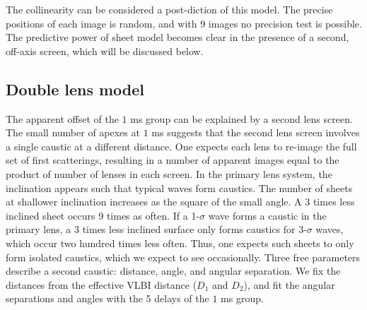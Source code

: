 \documentclass[useAMS,usenatbib]{mn2e}
\begin{document}
The collinearity can be considered a post-diction of this model.  The
precise positions of each image is random, and with 9 images no
precision test is possible.  The predictive power of sheet model
becomes clear in the presence of a second, off-axis screen, which will be discussed below.



\subsection{Double lens model}
\label{doublelensmodel}

The apparent offset of the $1$ ms group can be explained by a second lens
screen.  The small number of apexes at $1$ ms suggests that the second
lens screen involves a single caustic at a different distance.  One
expects each lens to re-image the full set of first scatterings,
resulting in a number of apparent images equal to the product of
number of lenses in each screen.
In the
primary lens system, the inclination appears such that typical waves
form caustics.  The number of sheets at shallower inclination
increases as the square of the small angle.  A 3 times less inclined
sheet occurs 9 times as often.  If a 1-$\sigma$ wave forms a caustic
in the primary lens, a 3 times less inclined surface only forms
caustics for 3-$\sigma$ waves, which occur two hundred times less
often.  Thus, one expects such sheets to only form isolated caustics,
which we expect to see occasionally.  Three free parameters describe a
second caustic: distance, angle, and angular separation.  We fix the
distances from the effective VLBI distance ($D_1$ and $D_2$), and fit the angular
separations and angles with the 5 delays of the $1$ ms group.
\end{document}
